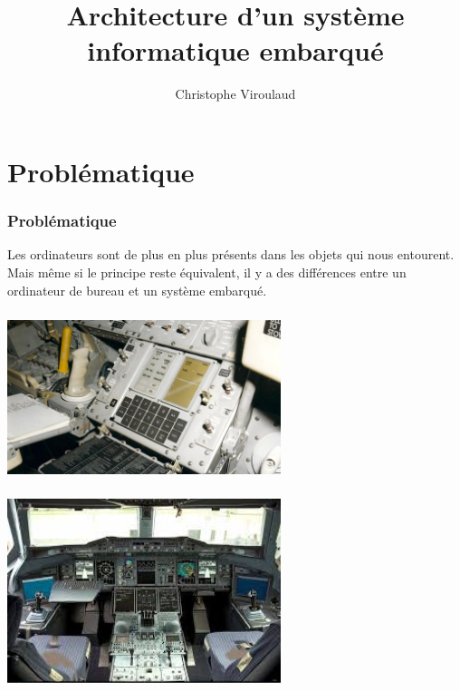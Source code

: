 \documentclass[svgnames,11pt]{beamer}
\author[]{Christophe Viroulaud}
\title{Architecture d'un système informatique embarqué}
\date{}
\institute{Seconde SNT}
\begin{document}
\begin{frame}
    \titlepage
\end{frame}

\section{Problématique}
\begin{frame}
    \frametitle{Problématique}

    Les ordinateurs sont de plus en plus présents dans les objets qui nous entourent. Mais même si le principe reste équivalent, il y a des différences entre un ordinateur de bureau et un système embarqué.

\end{frame}
\begin{frame}
    \frametitle{}

    \begin{center}
        \centering
        \includegraphics[width=8cm]{ressources/apollo.jpeg}
        \label{IMG}
    \end{center}

\end{frame}
\begin{frame}
    \frametitle{}

    \begin{center}
        \centering
        \includegraphics[width=8cm]{ressources/a320.jpeg}
        \label{IMG}
    \end{center}

\end{frame}
\end{document}
